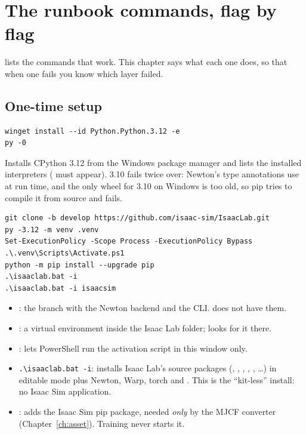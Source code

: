 \chapter{The runbook commands, flag by flag}
\label{ch:runbook}

 lists the commands that work. This chapter says what each
one does, so that when one fails you know which layer failed.

\section{One-time setup}

\begin{lstlisting}[style=shell]
winget install --id Python.Python.3.12 -e
py -0
\end{lstlisting}
Installs CPython 3.12 from the Windows package manager and lists the
installed interpreters ( must appear). 3.10 fails twice over:
Newton's type annotations use  at run time, and the only
 wheel for 3.10 on Windows is too old, so pip tries to
compile it from source and fails.

\begin{lstlisting}[style=shell]
git clone -b develop https://github.com/isaac-sim/IsaacLab.git
py -3.12 -m venv .venv
Set-ExecutionPolicy -Scope Process -ExecutionPolicy Bypass
.\.venv\Scripts\Activate.ps1
python -m pip install --upgrade pip
.\isaaclab.bat -i
.\isaaclab.bat -i isaacsim
\end{lstlisting}
\begin{itemize}[leftmargin=1.6em]
  \item {}: the branch with the Newton backend and the
         CLI.  does not have them.
  \item {}: a virtual environment inside the Isaac
        Lab folder;  looks for it there.
  \item {}: lets PowerShell run the
        activation script in this window only.
  \item \texttt{.\textbackslash isaaclab.bat -i}: installs Isaac Lab's source packages
        (, , ,
        , , \ldots) in editable
        mode plus Newton, Warp, torch and . This is the
        ``kit-less'' install: no Isaac Sim application.
  \item {}: adds the Isaac Sim pip package, needed
        \emph{only} by the MJCF converter (Chapter~\ref{ch:asset}). Training
        never starts it.
\end{itemize}

